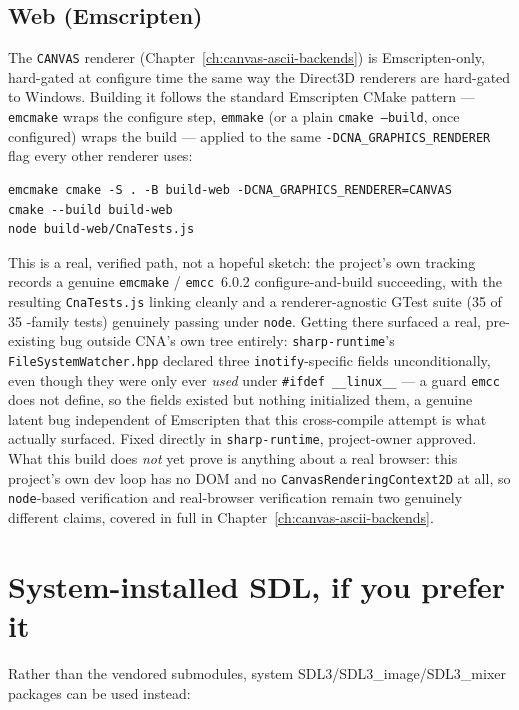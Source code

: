 \subsection{Web (Emscripten)}

The \texttt{CANVAS} renderer (Chapter~\ref{ch:canvas-ascii-backends}) is Emscripten-only, hard-gated
at configure time the same way the Direct3D renderers are hard-gated to Windows. Building it
follows the standard Emscripten CMake pattern --- \texttt{emcmake} wraps the configure step,
\texttt{emmake} (or a plain \texttt{cmake~--build}, once configured) wraps the build --- applied
to the same \texttt{-DCNA\_GRAPHICS\_RENDERER} flag every other renderer uses:

\begin{lstlisting}[style=cnashell]
emcmake cmake -S . -B build-web -DCNA_GRAPHICS_RENDERER=CANVAS
cmake --build build-web
node build-web/CnaTests.js
\end{lstlisting}

This is a real, verified path, not a hopeful sketch: the project's own tracking records a
genuine \texttt{emcmake} / \texttt{emcc}~6.0.2 configure-and-build succeeding, with the resulting
\texttt{CnaTests.js} linking cleanly and a renderer-agnostic GTest suite (35 of 35
-family tests) genuinely passing under \texttt{node}. Getting there
surfaced a real, pre-existing bug outside CNA's own tree entirely: \texttt{sharp-runtime}'s
\texttt{FileSystemWatcher.hpp} declared three \texttt{inotify}-specific fields
unconditionally, even though they were only ever \emph{used} under \texttt{\#ifdef
\_\_linux\_\_} --- a guard \texttt{emcc} does not define, so the fields existed but nothing
initialized them, a genuine latent bug independent of Emscripten that this cross-compile
attempt is what actually surfaced. Fixed directly in \texttt{sharp-runtime}, project-owner
approved. What this build does \emph{not} yet prove is anything about a real browser: this
project's own dev loop has no DOM and no \texttt{CanvasRenderingContext2D} at all, so
\texttt{node}-based verification and real-browser verification remain two genuinely different
claims, covered in full in Chapter~\ref{ch:canvas-ascii-backends}.

\section{System-installed SDL, if you prefer it}

Rather than the vendored submodules, system SDL3/SDL3\_image/SDL3\_mixer packages can be
used instead:

